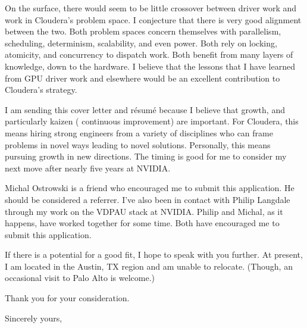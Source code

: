 \documentclass{letter} %
\begin{document}
\begin{letter}{
}
On the surface, there would seem to be little crossover between driver work
and work in Cloudera's problem space. I conjecture that there is very good
alignment
between the two. Both problem spaces concern themselves with parallelism,
scheduling, determinism, scalability, and even power. Both rely on locking,
atomicity, and concurrency to dispatch work. Both benefit from many layers
of knowledge, down to the hardware. I believe that the lessons that I have
learned from GPU driver work and elsewhere would be an excellent contribution
to Cloudera's strategy.


I am sending this cover letter and r\'esum\'e because I believe that
growth, and particularly kaizen (
continuous improvement) are important. For Cloudera, this means hiring
strong engineers from a variety of disciplines who can frame problems in
novel ways leading to novel solutions. Personally, this means pursuing
growth in new directions. The timing is good for me to consider my next
move after nearly five years at NVIDIA.

Michal Ostrowski is a friend who encouraged me to submit this application.
He should be considered a referrer. I've also been in contact with
Philip Langdale through my work on the VDPAU stack at NVIDIA. Philip and
Michal, as it happens, have worked together for some time. Both have
encouraged me to submit this application.

If there is a potential for a good fit, I hope to speak with you further.
At present, I am located in the Austin, TX region and am unable to relocate.
(Though, an occasional visit to Palo Alto is welcome.)

Thank you for your consideration.

\closing{Sincerely yours,}




\end{letter}
\end{document}
